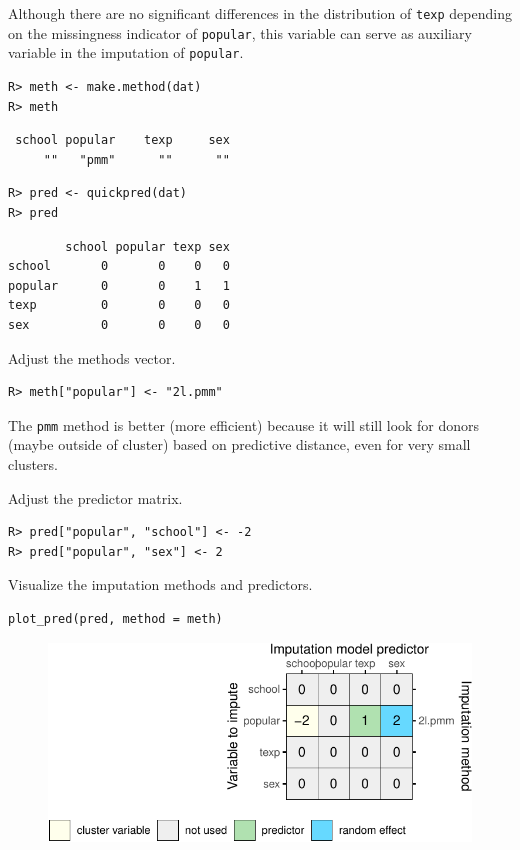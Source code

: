 \documentclass[
  article]{jss}
\begin{document}
Although there are no significant differences in the distribution of
\texttt{texp} depending on the missingness indicator of
\texttt{popular}, this variable can serve as auxiliary variable in the
imputation of \texttt{popular}.

\begin{verbatim}
R> meth <- make.method(dat)
R> meth
\end{verbatim}

\begin{verbatim}
 school popular    texp     sex 
     ""   "pmm"      ""      "" 
\end{verbatim}

\begin{verbatim}
R> pred <- quickpred(dat)
R> pred
\end{verbatim}

\begin{verbatim}
        school popular texp sex
school       0       0    0   0
popular      0       0    1   1
texp         0       0    0   0
sex          0       0    0   0
\end{verbatim}

Adjust the methods vector.

\begin{verbatim}
R> meth["popular"] <- "2l.pmm"
\end{verbatim}

The \texttt{pmm} method is better (more efficient) because it will still
look for donors (maybe outside of cluster) based on predictive distance,
even for very small clusters.

Adjust the predictor matrix.

\begin{verbatim}
R> pred["popular", "school"] <- -2
R> pred["popular", "sex"] <- 2
\end{verbatim}

Visualize the imputation methods and predictors.

\begin{verbatim}
plot_pred(pred, method = meth)
\end{verbatim}

\begin{figure}[h]

{\centering \includegraphics{manuscript_files/figure-pdf/unnamed-chunk-16-1.pdf}

}

\end{figure}
\end{document}
